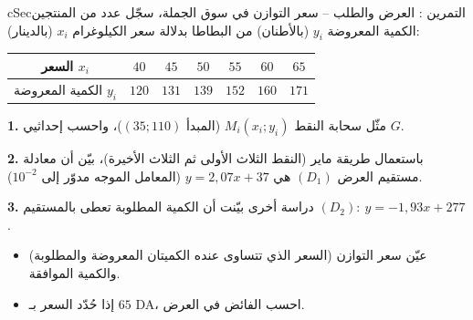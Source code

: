 \documentclass[12pt,a4paper]{article}
\newenvironment{BOX}[2]{\begin{otherlanguage}{english}\begin{arbox}{#1}{#2}}{\end{arbox}\end{otherlanguage}}
\newcounter{exo}
\newenvironment{tamrin}[1]{\stepcounter{exo}\begin{BOX}{cSec}{التمرين \theexo: #1}}{\end{BOX}}
\newenvironment{LTR}{\begin{otherlanguage}{english}}{\end{otherlanguage}}
\newcommand{\ar}[1]{\foreignlanguage{arabic}{#1}}
\newenvironment{sq}{\begin{itemize}[leftmargin=2.4em,itemsep=3pt]}{\end{itemize}}
\newcommand{\qa}{\item[(أ)]}\newcommand{\qb}{\item[(ب)]}\newcommand{\qc}{\item[(جـ)]}\newcommand{\qd}{\item[(د)]}\newcommand{\qe}{\item[(هـ)]}
\newcommand{\QQ}[1]{\par\smallskip\textbf{#1.} }
\begin{document}
\begin{tamrin}{العرض والطلب -- سعر التوازن}
في سوق الجملة، سجّل عدد من المنتجين الكمية المعروضة $y_i$ (بالأطنان) من البطاطا بدلالة سعر الكيلوغرام $x_i$ (بالدينار):
\begin{center}\begin{LTR}\renewcommand{\arraystretch}{1.35}\small
\begin{tabular}{|c|c|c|c|c|c|c|}\hline
\rowcolor{cSec!12}\ar{السعر} $x_i$ & $40$ & $45$ & $50$ & $55$ & $60$ & $65$\\\hline
\ar{الكمية المعروضة} $y_i$ & $120$ & $131$ & $139$ & $152$ & $160$ & $171$\\\hline
\end{tabular}\end{LTR}\end{center}
\QQ{1} مثّل سحابة النقط $M_i(x_i;y_i)$ (المبدأ $(35;110)$)، واحسب إحداثيي $G$.
\QQ{2} باستعمال طريقة ماير (النقط الثلاث الأولى ثم الثلاث الأخيرة)، بيّن أن معادلة مستقيم العرض $(D_1)$ هي $y=2{,}07x+37$ (المعامل الموجه مدوّر إلى $10^{-2}$).
\QQ{3} دراسة أخرى بيّنت أن الكمية المطلوبة تعطى بالمستقيم $(D_2):\ y=-1{,}93x+277$.
\begin{sq}
\qa عيّن سعر التوازن (السعر الذي تتساوى عنده الكميتان المعروضة والمطلوبة) والكمية الموافقة.
\qb إذا حُدّد السعر بـ $65$ DA، احسب الفائض في العرض.
\end{sq}
\end{tamrin}
\end{document}
